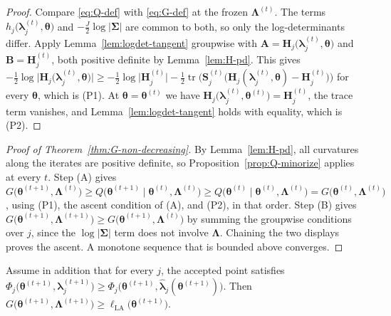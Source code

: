 \begin{proof}
Compare \eqref{eq:Q-def} with \eqref{eq:G-def} at the frozen $\bm{\Lambda}^{(t)}$. The terms $h_{j}\big(\bm{\lambda}_{j}^{(t)},\bm{\theta}\big)$ and $-\frac{J}{2}\log|\bm{\Sigma}|$ are common to both, so only the log-determinants differ. Apply Lemma~\ref{lem:logdet-tangent} groupwise with $\mathbf{A}=\mathbf{H}_{j}\big(\bm{\lambda}_{j}^{(t)},\bm{\theta}\big)$ and $\mathbf{B}=\mathbf{H}_{j}^{(t)}$, both positive definite by Lemma~\ref{lem:H-pd}. This gives $-\frac{1}{2}\log\big|\mathbf{H}_{j}\big(\bm{\lambda}_{j}^{(t)},\bm{\theta}\big)\big|\geq-\frac{1}{2}\log\big|\mathbf{H}_{j}^{(t)}\big|-\frac{1}{2}\operatorname{tr}\Big(\mathbf{S}_{j}^{(t)}\big(\mathbf{H}_{j}(\bm{\lambda}_{j}^{(t)},\bm{\theta})-\mathbf{H}_{j}^{(t)}\big)\Big)$ for every $\bm{\theta}$, which is (P1). At $\bm{\theta}=\bm{\theta}^{(t)}$ we have $\mathbf{H}_{j}\big(\bm{\lambda}_{j}^{(t)},\bm{\theta}^{(t)}\big)=\mathbf{H}_{j}^{(t)}$, the trace term vanishes, and Lemma~\ref{lem:logdet-tangent} holds with equality, which is (P2).
\end{proof}

\begin{proof}[Proof of Theorem~\ref{thm:G-non-decreasing}]
By Lemma~\ref{lem:H-pd}, all curvatures along the iterates are positive definite, so Proposition~\ref{prop:Q-minorize} applies at every $t$. Step (A) gives $G\big(\bm{\theta}^{(t+1)},\bm{\Lambda}^{(t)}\big)\geq Q\big(\bm{\theta}^{(t+1)}\mid\bm{\theta}^{(t)},\bm{\Lambda}^{(t)}\big)\geq Q\big(\bm{\theta}^{(t)}\mid\bm{\theta}^{(t)},\bm{\Lambda}^{(t)}\big)=G\big(\bm{\theta}^{(t)},\bm{\Lambda}^{(t)}\big)$, using (P1), the ascent condition of (A), and (P2), in that order. Step (B) gives $G\big(\bm{\theta}^{(t+1)},\bm{\Lambda}^{(t+1)}\big)\geq G\big(\bm{\theta}^{(t+1)},\bm{\Lambda}^{(t)}\big)$ by summing the groupwise conditions over $j$, since the $\log|\bm{\Sigma}|$ term does not involve $\bm{\Lambda}$. Chaining the two displays proves the ascent. A monotone sequence that is bounded above converges.
\end{proof}

\begin{corollary}
Assume in addition that for every $j$, the accepted point satisfies $\Phi_{j}\big(\bm{\theta}^{(t+1)},\bm{\lambda}_{j}^{(t+1)}\big)\geq\Phi_{j}\big(\bm{\theta}^{(t+1)},\hat{\bm{\lambda}}_{j}(\bm{\theta}^{(t+1)})\big)$. Then $G\big(\bm{\theta}^{(t+1)},\bm{\Lambda}^{(t+1)}\big)\geq\ell_{\text{LA}}\big(\bm{\theta}^{(t+1)}\big)$.
\label{cor:G-dominates}
\end{corollary}


